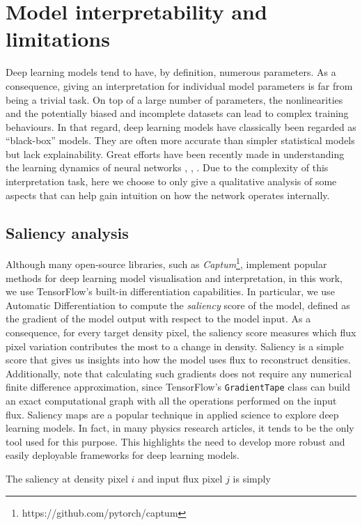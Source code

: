 \section{Model interpretability and limitations}
Deep learning models tend to have, by definition, numerous parameters. As a consequence, giving an interpretation for individual model parameters is far from being a trivial task. On top of a large number of parameters, the nonlinearities and the potentially biased and incomplete datasets can lead to complex training behaviours. In that regard, deep learning models have classically been regarded as ``black-box'' models. They are often more accurate than simpler statistical models but lack explainability. Great efforts have been recently made in understanding the learning dynamics of neural networks \cite{shwartzziv2017opening}, \cite{buhrmester2019analysis}, \cite{explaiNN}.
Due to the complexity of this interpretation task, here we choose to only give a qualitative analysis of some aspects that can help gain intuition on how the network operates internally.

\subsection{Saliency analysis}
Although many open-source libraries, such as \textit{Captum}\footnote{https://github.com/pytorch/captum}, implement popular methods for deep learning model visualisation and interpretation, in this work, we use TensorFlow's built-in differentiation capabilities. In particular, we use Automatic Differentiation to compute the \textit{saliency} score of the model, defined as the gradient of the model output with respect to the model input. As a consequence, for every target density pixel, the saliency score measures which flux pixel variation contributes the most to a change in density. Saliency is a simple score that gives us insights into how the model uses flux to reconstruct densities. Additionally, note that calculating such gradients does not require any numerical finite difference approximation, since TensorFlow's \texttt{GradientTape} class can build an exact computational graph with all the operations performed on the input flux. Saliency maps are a popular technique in applied science to explore deep learning models. In fact, in many physics research articles, it tends to be the only tool used for this purpose. This highlights the need to develop more robust and easily deployable frameworks for deep learning models.

The saliency at density pixel $i$ and input flux pixel $j$ is simply


